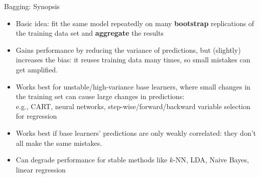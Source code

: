 \documentclass[11pt,compress,t,notes=noshow, xcolor=table]{beamer}
\begin{document}
\begin{vbframe}{Bagging: Synopsis}

  \begin{itemize}
    \item Basic idea: fit the same model repeatedly on many \textbf{bootstrap} replications of the training data set and \textbf{aggregate} the results
    \item Gains performance by reducing the variance of predictions, but (slightly) increases the bias: it reuses training data many times, so small mistakes can get amplified. 
    \item Works best for unstable/high-variance base learners, where small changes in the training set can cause large changes in predictions:\\
    e.g., CART, neural networks, step-wise/forward/backward variable selection for regression\\
     \item Works best if base learners' predictions are only weakly correlated: they don't all make the same mistakes.
         \item Can degrade performance for stable methods like $k$-NN, LDA, Naive Bayes, linear regression
  \end{itemize}
\end{vbframe}

\endlecture
\end{document}
